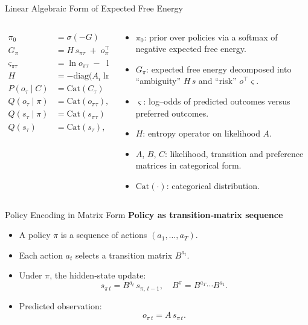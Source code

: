 \documentclass[aspectratio=1610, english]{beamer}
\begin{document}
\begin{frame}{Linear Algebraic Form of Expected Free Energy}
\begin{columns}[t]
  \begin{column}{0.4\textwidth}
    \[
    \begin{aligned}
    \pi_0 &= \sigma(-G) \\[6pt]
    G_\pi &= H \, s_{\pi\tau} \;+\; o_{\pi\tau}^\top\,\varsigma_{\pi\tau} \\[4pt]
    \varsigma_{\pi\tau} &= \ln o_{\pi\tau} \;-\; \ln C_\tau \\[4pt]
    H &= -\mathrm{diag}\bigl(A_i \ln A_i\bigr) \\[4pt]
    P(o_\tau \!\mid\! C) &= \mathrm{Cat}(C_\tau) \\[4pt]
    Q(o_\tau \!\mid\! \pi) &= \mathrm{Cat}(o_{\pi\tau}),\quad o_{\pi\tau}=A\,s_{\pi\tau} \\[4pt]
    Q(s_\tau \!\mid\! \pi) &= \mathrm{Cat}(s_{\pi\tau}) \\[4pt]
    Q(s_\tau) &= \mathrm{Cat}(s_\tau),\quad s_\tau = \sum_{\pi} \pi\,s_{\pi\tau}
    \end{aligned}
    \]
  \end{column}
  \begin{column}{0.58\textwidth}
    \begin{itemize}
      \item \(\pi_0\): prior over policies via a softmax of negative expected free energy.  
      \item \(G_\pi\): expected free energy decomposed into “ambiguity” \(H\,s\) and “risk” \(o^\top\varsigma\).  
      \item \(\varsigma\): log–odds of predicted outcomes versus preferred outcomes.  
      \item \(H\): entropy operator on likelihood \(A\).  
      \item \(A\), \(B\), \(C\): likelihood, transition and preference matrices in categorical form.  
      \item \(\mathrm{Cat}(\cdot)\): categorical distribution.  
    \end{itemize}
  \end{column}
\end{columns}
\end{frame}

\begin{frame}{Policy Encoding in Matrix Form}
    \textbf{Policy as transition‐matrix sequence}
    \begin{itemize}
      \item A policy \(\pi\) is a sequence of actions \((a_1,\dots,a_T)\).
      \item Each action \(a_t\) selects a transition matrix \(B^{a_t}\).
      \item Under \(\pi\), the hidden‐state update:
      \[
        s_{\pi\,t}
        = B^{a_t}\,s_{\pi,\,t-1},
        \quad
        B^\pi = B^{a_T}\cdots B^{a_1}.
      \]
      \item Predicted observation:
      \[
        o_{\pi\,t} = A\,s_{\pi\,t}.
      \]
    \end{itemize}
\end{frame}
\end{document}

